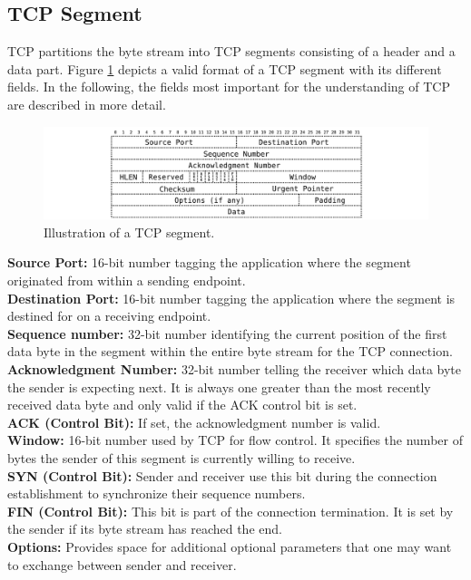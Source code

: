 \subsection*{TCP Segment}

TCP partitions the byte stream into TCP segments consisting of a header and a data part. Figure \ref{fig:TCPSegment} depicts a valid format of a TCP segment with its different fields. In the following, the fields most important for the understanding of TCP are described in more detail. 

\begin{figure} [H]
	\begin{center}
		\def\svgwidth{1\textwidth}
		\includegraphics[scale=0.2]{../illustrations/importantConcepts/TCPSegment.pdf}  
		\caption[]{Illustration of a TCP segment.}
		\label{fig:TCPSegment}
	\end{center}
\end{figure}

{\small \textbf{Source Port:} 16-bit number tagging the application where the segment originated from within a sending endpoint. \smallskip\\
\textbf{Destination Port:} 16-bit number tagging the application where the segment is destined for on a receiving endpoint. \smallskip\\
\textbf{Sequence number:} 32-bit number identifying the current position of the first data byte in the segment within the entire byte stream for the TCP connection. \smallskip\\
\textbf{Acknowledgment Number:} 32-bit number telling the receiver which data byte the sender is expecting next. It is always one greater than the most recently received data byte and only valid if the ACK control bit is set. \smallskip\\
\textbf{ACK (Control Bit):} If set, the acknowledgment number is valid. \smallskip\\
\textbf{Window:} 16-bit number used by TCP for flow control. It specifies the number of bytes the sender of this segment is currently willing to receive. \smallskip\\
\textbf{SYN (Control Bit):} Sender and receiver use this bit during the connection establishment to synchronize their sequence numbers.  \smallskip\\
\textbf{FIN (Control Bit):} This bit is part of the connection termination. It is set by the sender if its byte stream has reached the end. \smallskip\\
\textbf{Options:} Provides space for additional optional parameters that one may want to exchange between sender and receiver. 
}
 
